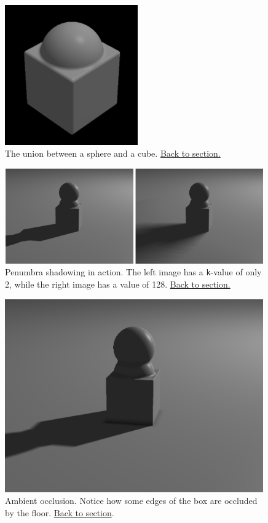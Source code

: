 \documentclass[abstract=off,oneside]{scrreprt}
\begin{document}
\begin{figure}[htb]
\centering
\includegraphics[width=0.51\textwidth]{./img/union.png}
\caption*{\label{fig:union}The union between a sphere and a cube. \hyperref[sec:creatingascene]{Back to section.}}
\end{figure}

\begin{figure}[htb]
\centering
\includegraphics[width=0.99\textwidth]{./img/penumbra.png}
\caption*{\label{fig:penumbra}Penumbra shadowing in action. The left image has a \verb~k~-value of only 2, while the right image has a value of 128. \hyperref[sec:shadows]{Back to section.}}
\end{figure}

\begin{figure}[htb]
\centering
\includegraphics[width=0.99\textwidth]{./img/ao.png}
\caption*{\label{fig:ao}Ambient occlusion. Notice how some edges of the box are occluded by the floor. \hyperref[sec:ao]{Back to section}.}
\end{figure}
\end{document}
